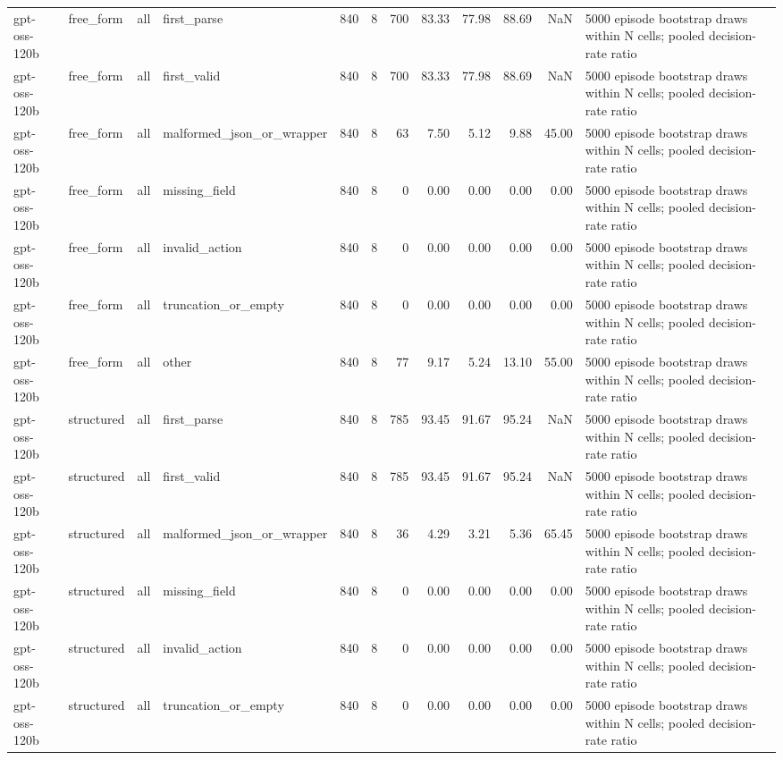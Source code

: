 \begin{tabular}{llllrrrrrrrl}
gpt-oss-120b & free\_form & all & first\_parse & 840 & 8 & 700 & 83.33 & 77.98 & 88.69 & NaN & 5000 episode bootstrap draws within N cells; pooled decision-rate ratio \\
gpt-oss-120b & free\_form & all & first\_valid & 840 & 8 & 700 & 83.33 & 77.98 & 88.69 & NaN & 5000 episode bootstrap draws within N cells; pooled decision-rate ratio \\
gpt-oss-120b & free\_form & all & malformed\_json\_or\_wrapper & 840 & 8 & 63 & 7.50 & 5.12 & 9.88 & 45.00 & 5000 episode bootstrap draws within N cells; pooled decision-rate ratio \\
gpt-oss-120b & free\_form & all & missing\_field & 840 & 8 & 0 & 0.00 & 0.00 & 0.00 & 0.00 & 5000 episode bootstrap draws within N cells; pooled decision-rate ratio \\
gpt-oss-120b & free\_form & all & invalid\_action & 840 & 8 & 0 & 0.00 & 0.00 & 0.00 & 0.00 & 5000 episode bootstrap draws within N cells; pooled decision-rate ratio \\
gpt-oss-120b & free\_form & all & truncation\_or\_empty & 840 & 8 & 0 & 0.00 & 0.00 & 0.00 & 0.00 & 5000 episode bootstrap draws within N cells; pooled decision-rate ratio \\
gpt-oss-120b & free\_form & all & other & 840 & 8 & 77 & 9.17 & 5.24 & 13.10 & 55.00 & 5000 episode bootstrap draws within N cells; pooled decision-rate ratio \\
gpt-oss-120b & structured & all & first\_parse & 840 & 8 & 785 & 93.45 & 91.67 & 95.24 & NaN & 5000 episode bootstrap draws within N cells; pooled decision-rate ratio \\
gpt-oss-120b & structured & all & first\_valid & 840 & 8 & 785 & 93.45 & 91.67 & 95.24 & NaN & 5000 episode bootstrap draws within N cells; pooled decision-rate ratio \\
gpt-oss-120b & structured & all & malformed\_json\_or\_wrapper & 840 & 8 & 36 & 4.29 & 3.21 & 5.36 & 65.45 & 5000 episode bootstrap draws within N cells; pooled decision-rate ratio \\
gpt-oss-120b & structured & all & missing\_field & 840 & 8 & 0 & 0.00 & 0.00 & 0.00 & 0.00 & 5000 episode bootstrap draws within N cells; pooled decision-rate ratio \\
gpt-oss-120b & structured & all & invalid\_action & 840 & 8 & 0 & 0.00 & 0.00 & 0.00 & 0.00 & 5000 episode bootstrap draws within N cells; pooled decision-rate ratio \\
gpt-oss-120b & structured & all & truncation\_or\_empty & 840 & 8 & 0 & 0.00 & 0.00 & 0.00 & 0.00 & 5000 episode bootstrap draws within N cells; pooled decision-rate ratio \\

\end{tabular}
